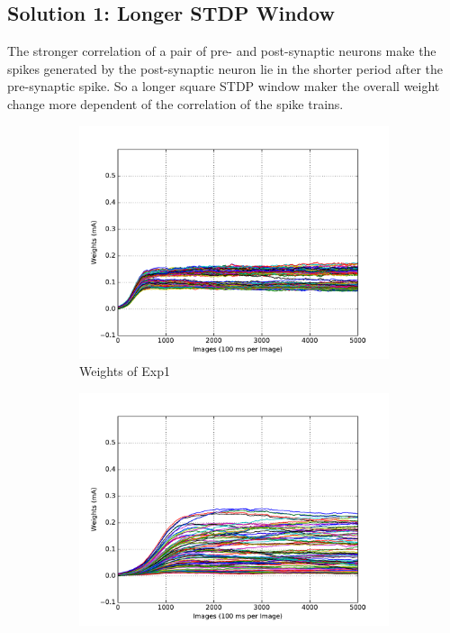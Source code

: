 \subsection{Solution 1: Longer STDP Window}
The stronger correlation of a pair of pre- and post-synaptic neurons make the spikes generated by the post-synaptic neuron lie in the shorter period after the pre-synaptic spike.
So a longer square STDP window maker the overall weight change more dependent of the correlation of the spike trains.
\begin{figure}
	\centering
	\begin{subfigure}[t]{0.4\textwidth}
		\includegraphics[width=\textwidth]{pics_sdlm/01_exp_SAE_Orig_long/exp1_weights_s.pdf}
		\caption{Weights of Exp1}
	\end{subfigure}
	\begin{subfigure}[t]{0.4\textwidth}
		\includegraphics[width=\textwidth]{pics_sdlm/01_exp_SAE_Orig_long/exp2_weights_s.pdf}

\end{subfigure}
\end{figure}
